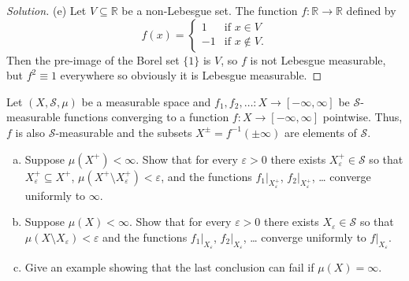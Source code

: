 \documentclass[10pt]{article}
\providecommand{\eps}{\varepsilon}
\providecommand{\RR}{\mathbb R}
\providecommand{\ii}{\item}
\providecommand{\inv}{^{-1}}
\newenvironment{soln}{\begin{proof}[Solution]}{\end{proof}}
\begin{document}
\begin{soln}
    (e) Let $V\subseteq\RR$ be a non-Lebesgue set.
    The function $f\colon\RR\to\RR$ defined by
    \begin{equation*}
        f(x) = \begin{cases}
	    1 & \text{if }x\in V\\
	    -1 & \text{if }x\notin V.
        \end{cases}
    \end{equation*}
    Then the pre-image of the Borel set $\{1\}$ is $V$,
    so $f$ is not Lebesgue measurable, but $f^2\equiv1$ everywhere
    so obviously it is Lebesgue measurable.
\end{soln}

\pagebreak
\begin{problem}
    Let $(X,\mathcal S, \mu)$ be a measurable space and
    $f_1,f_2,\dots\colon X\to[-\infty,\infty]$ be
    $\mathcal S$-measurable functions converging to
    a function $f\colon X\to[-\infty,\infty]$ pointwise.
    Thus, $f$ is also $\mathcal S$-measurable and the subsets
    $X^\pm = f\inv(\pm\infty)$ are elements of $\mathcal S$.
    \begin{enumerate}[(a)]
        \ii Suppose $\mu(X^+) < \infty$.
	Show that for every $\eps>0$ there exists $X_\eps^+\in\mathcal S$
	so that $X_\eps^+\subseteq X^+$, $\mu(X^+\setminus X_\eps^+)<\eps$,
	and the functions $f_1|_{X_\eps^+}$, $f_2|_{X_\eps^+}$, \dots
	converge uniformly to $\infty$.
	\ii Suppose $\mu(X) < \infty$. Show that for every $\eps > 0$
	there exists $X_\eps\in\mathcal S$ so that $\mu(X\setminus X_\eps)<\eps$
	and the functions $f_1|_{X_\eps}$, $f_2|_{X_\eps}$, \dots
	converge uniformly to $f|_{X_\eps}$.
	\ii Give an example showing that the last conclusion can fail
	if $\mu(X) = \infty$.
    \end{enumerate}
\end{problem}
\end{document}
